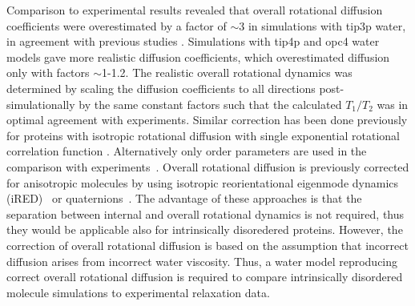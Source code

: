 \documentclass[pre,aps,floatfix,authordate1-4,twocolumn]{revtex4-1}
\begin{document}
Comparison to experimental results revealed that overall rotational diffusion
coefficients were overestimated by a factor of $\sim$3 in simulations with tip3p
water, in agreement with previous studies \cite{prompers02,wong08,anderson12}. Simulations
with tip4p and opc4 water models gave more realistic diffusion coefficients,
which overestimated diffusion only with factors $\sim$1-1.2.
The realistic overall rotational dynamics was determined by
scaling the diffusion coefficients to all directions post-simulationally by the
same constant factors such that the calculated $T_1/T_2$ was in optimal
agreement with experiments. Similar correction has been done previously
for proteins with isotropic rotational diffusion with single exponential rotational correlation
function \cite{showalter07a,showalter07b,maragakis08,gu14,allner15}.
Alternatively only order parameters are used in the comparison with
experiments~\cite{gu14,maragakis08,trbovic08,best04}.
Overall rotational diffusion is previously corrected for anisotropic
molecules by using isotropic reorientational eigenmode dynamics (iRED)~\cite{prompers02}
or quaternions~\cite{anderson12}. The advantage of these approaches is that
the separation between internal and overall rotational dynamics is not
required, thus they would be applicable also for intrinsically disoredered
proteins. However, the correction of overall rotational diffusion is based on
the assumption that incorrect diffusion arises from incorrect water viscosity.
Thus, a water model reproducing correct overall rotational diffusion is required to
compare intrinsically disordered molecule simulations to experimental
relaxation data.


\end{document}
